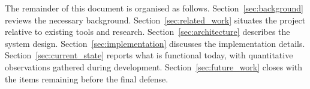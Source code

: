 The remainder of this document is organised as follows.
Section~\ref{sec:background} reviews the necessary background.
Section~\ref{sec:related_work} situates the project relative to existing
tools and research. Section~\ref{sec:architecture} describes the system
design. Section~\ref{sec:implementation} discusses the implementation
details. Section~\ref{sec:current_state} reports what is functional
today, with quantitative observations gathered during development.
Section~\ref{sec:future_work} closes with the items remaining before the
final defense.
